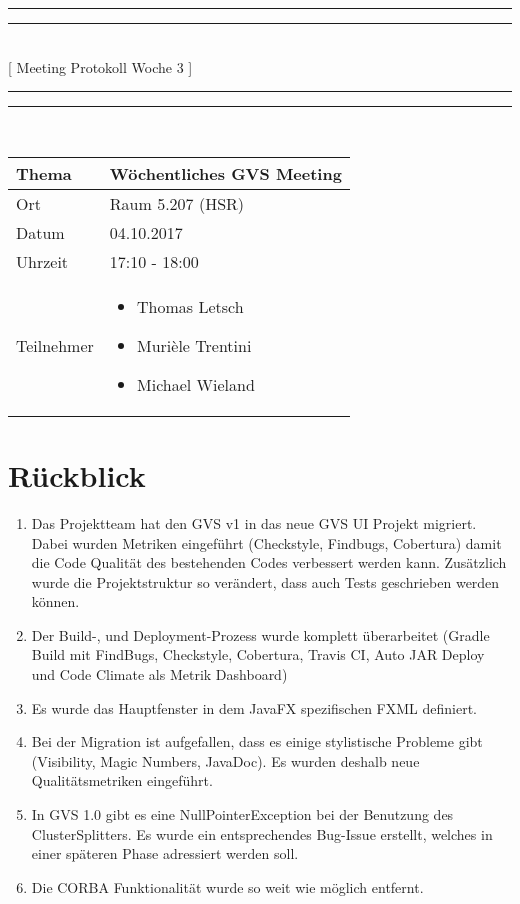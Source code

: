 \documentclass[11pt, a4paper,oneside]{scrartcl}
\begin{document}
\centering
\rule{\textwidth}{1.6pt}\vspace*{-\baselineskip}\vspace*{2pt} %
\rule{\textwidth}{0.4pt}\\[\baselineskip] %
{\LARGE [ Meeting Protokoll Woche 3 ]}\\[0.2\baselineskip] %
\rule{\textwidth}{0.4pt}\vspace*{-\baselineskip}\vspace{3.2pt} %
\rule{\textwidth}{1.6pt}\\[2\baselineskip] %

\begin{tabu} to \linewidth {l X }
	\toprule
	\textbf{Thema} & \textbf{Wöchentliches GVS Meeting} \\
	\midrule
	Ort & Raum 5.207 (HSR) \\
	Datum & 04.10.2017 \\
	Uhrzeit & 17:10 - 18:00 \\
	Teilnehmer & 
	\begin{minipage}[t]{\textwidth}
	  	\begin{itemize}
	  		\item Thomas Letsch
			\item Murièle Trentini
			\item Michael Wieland
	  	\end{itemize}
	\end{minipage}
	\\
	\bottomrule
\end{tabu}


\section{Rückblick}
\begin{enumerate}
	\item Das Projektteam hat den GVS v1 in das neue GVS UI Projekt migriert. Dabei wurden Metriken eingeführt (Checkstyle, Findbugs, Cobertura) damit die Code Qualität des bestehenden Codes verbessert werden kann. Zusätzlich wurde die Projektstruktur so verändert, dass auch Tests geschrieben werden können.
	\item Der Build-, und Deployment-Prozess wurde komplett überarbeitet (Gradle Build mit FindBugs, Checkstyle, Cobertura, Travis CI, Auto JAR Deploy und Code Climate als Metrik Dashboard)
	\item Es wurde das Hauptfenster in dem JavaFX spezifischen FXML definiert.
	\item Bei der Migration ist aufgefallen, dass es einige stylistische Probleme gibt (Visibility, Magic Numbers, JavaDoc). Es wurden deshalb neue Qualitätsmetriken eingeführt.
	\item In GVS 1.0 gibt es eine NullPointerException bei der Benutzung des ClusterSplitters. Es wurde ein entsprechendes Bug-Issue erstellt, welches in einer späteren Phase adressiert werden soll.
	\item Die CORBA Funktionalität wurde so weit wie möglich entfernt. 
\end{enumerate}
\end{document}
